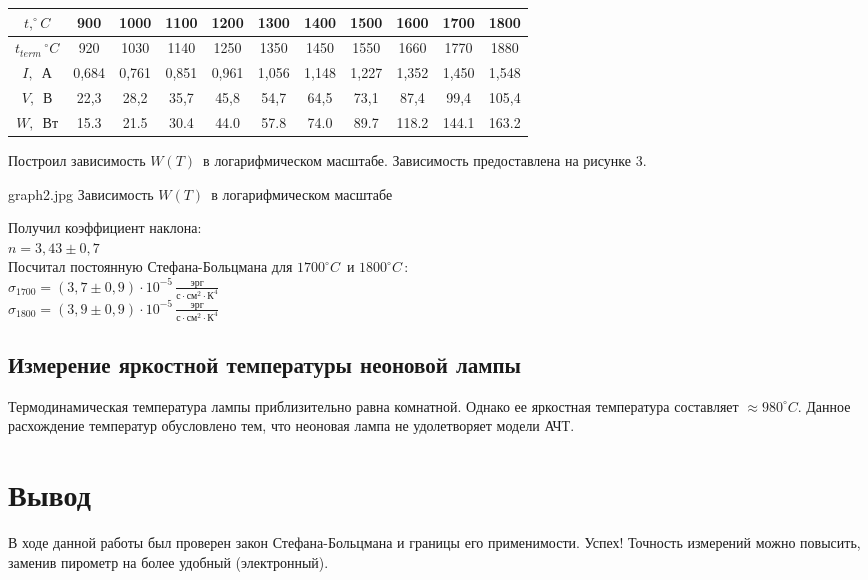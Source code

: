 \begin{table}[h!]
\begin{center}

    \begin{tabular}{|c|c|c|c|c|c|c|c|c|c|c|}
    \hline
    $ t, ^\circ C $          & 900   & 1000  & 1100  & 1200  & 1300  & 1400  & 1500  & 1600  & 1700  & 1800  \\ \hline
    $ t_{term} \, ^\circ C $ & 920   & 1030  & 1140  & 1250  & 1350  & 1450  & 1550  & 1660  & 1770  & 1880  \\ \hline
    $ I, \, $ А              & 0,684 & 0,761 & 0,851 & 0,961 & 1,056 & 1,148 & 1,227 & 1,352 & 1,450 & 1,548 \\ \hline
    $ V, \, $ В              & 22,3  & 28,2  & 35,7  & 45,8  & 54,7  & 64,5  & 73,1  & 87,4  & 99,4  & 105,4 \\ \hline
    $ W, \, $ Вт             & 15.3  & 21.5  & 30.4  & 44.0  & 57.8  & 74.0  & 89.7  & 118.2 & 144.1 & 163.2 \\ \hline
    \end{tabular}

\end{center}
\end{table}

Построил зависимость $ W \left( T \right) \, $ в логарифмическом масштабе. Зависимость
предоставлена на рисунке 3.

{graph2.jpg}
{Зависимость $ W \left( T \right) \, $ в логарифмическом масштабе}

Получил коэффициент наклона: \\

$ n = 3,43 \pm 0,7 $ \\

Посчитал постоянную Стефана-Больцмана для $ 1700 ^\circ C \, $ и $ 1800 ^\circ C \, $: \\

$ \sigma_{1700} = \left( 3,7 \pm 0,9 \right) \cdot 10^{-5} \,
\frac{\text{эрг}} {\text{с} \cdot \text{см}^2 \cdot \text{К}^4} $ \\

$ \sigma_{1800} = \left( 3,9 \pm 0,9 \right) \cdot 10^{-5} \,
\frac{\text{эрг}} {\text{с} \cdot \text{см}^2 \cdot \text{К}^4} $ \\

\subsection{Измерение яркостной температуры неоновой лампы}

Термодинамическая температура лампы приблизительно равна комнатной. Однако ее яркостная
температура составляет $ \approx 980^\circ C $. Данное расхождение температур обусловлено
тем, что неоновая лампа не удолетворяет модели АЧТ.

\section{Вывод}

В ходе данной работы был проверен закон Стефана-Больцмана и границы его применимости. Успех!
Точность измерений можно повысить, заменив пирометр на более удобный (электронный).
